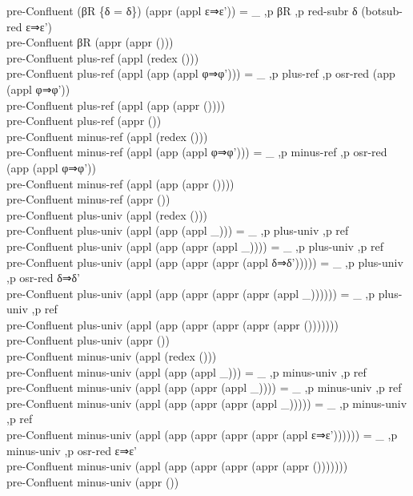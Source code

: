 {\begin{code}
{\>pre-Confluent (βR \{δ = δ\}) (appr (appl ε⇒ε')) = \_ ,p βR ,p red-subr δ (botsub-red ε⇒ε')\<\\
\>pre-Confluent βR (appr (appr ()))\<\\
\>pre-Confluent plus-ref (appl (redex ()))\<\\
\>pre-Confluent plus-ref (appl (app (appl φ⇒φ'))) = \_ ,p plus-ref ,p osr-red (app (appl φ⇒φ'))\<\\
\>pre-Confluent plus-ref (appl (app (appr ())))\<\\
\>pre-Confluent plus-ref (appr ())\<\\
\>pre-Confluent minus-ref (appl (redex ()))\<\\
\>pre-Confluent minus-ref (appl (app (appl φ⇒φ'))) = \_ ,p minus-ref ,p osr-red (app (appl φ⇒φ'))\<\\
\>pre-Confluent minus-ref (appl (app (appr ())))\<\\
\>pre-Confluent minus-ref (appr ())\<\\
\>pre-Confluent plus-univ (appl (redex ()))\<\\
\>pre-Confluent plus-univ (appl (app (appl \_))) = \_ ,p plus-univ ,p ref\<\\
\>pre-Confluent plus-univ (appl (app (appr (appl \_)))) = \_ ,p plus-univ ,p ref\<\\
\>pre-Confluent plus-univ (appl (app (appr (appr (appl δ⇒δ'))))) = \_ ,p plus-univ ,p osr-red δ⇒δ'\<\\
\>pre-Confluent plus-univ (appl (app (appr (appr (appr (appl \_)))))) = \_ ,p plus-univ ,p ref\<\\
\>pre-Confluent plus-univ (appl (app (appr (appr (appr (appr ()))))))\<\\
\>pre-Confluent plus-univ (appr ())\<\\
\>pre-Confluent minus-univ (appl (redex ()))\<\\
\>pre-Confluent minus-univ (appl (app (appl \_))) = \_ ,p minus-univ ,p ref\<\\
\>pre-Confluent minus-univ (appl (app (appr (appl \_)))) = \_ ,p minus-univ ,p ref\<\\
\>pre-Confluent minus-univ (appl (app (appr (appr (appl \_))))) = \_ ,p minus-univ ,p ref\<\\
\>pre-Confluent minus-univ (appl (app (appr (appr (appr (appl ε⇒ε')))))) = \_ ,p minus-univ ,p osr-red ε⇒ε'\<\\
\>pre-Confluent minus-univ (appl (app (appr (appr (appr (appr ()))))))\<\\
\>pre-Confluent minus-univ (appr ())\<\\
}
\end{code}}
